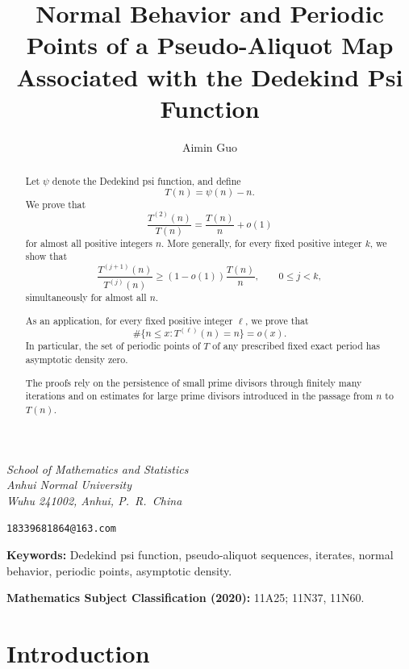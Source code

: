 \documentclass{article}
\begin{document}
\title{Normal Behavior and Periodic Points of a Pseudo-Aliquot Map Associated with the Dedekind Psi Function}

\author{Aimin Guo}

\date{}

\maketitle
\vspace{-2.0em}

\begin{center}
\small

\textit{School of Mathematics and Statistics}\\
\textit{Anhui Normal University}\\
\textit{Wuhu 241002, Anhui, P.~R.~China}

\vspace{0.4em}

\texttt{18339681864@163.com}

\end{center}

\begin{abstract}
Let $\psi$ denote the Dedekind psi function, and define
\[
T(n)=\psi(n)-n.
\]
We prove that
\[
\frac{T^{(2)}(n)}{T(n)}
=
\frac{T(n)}{n}+o(1)
\]
for almost all positive integers $n$. More generally, for every fixed
positive integer $k$, we show that
\[
\frac{T^{(j+1)}(n)}{T^{(j)}(n)}
\ge
(1-o(1))\frac{T(n)}{n},
\qquad 0\le j<k,
\]
simultaneously for almost all $n$.

As an application, for every fixed positive integer $\ell$, we prove
that
\[
\#\{n\le x:T^{(\ell)}(n)=n\}=o(x).
\]
In particular, the set of periodic points of $T$ of any prescribed
fixed exact period has asymptotic density zero.

The proofs rely on the persistence of small prime divisors through
finitely many iterations and on estimates for large prime divisors
introduced in the passage from $n$ to $T(n)$.
\end{abstract}

\noindent\textbf{Keywords:}
Dedekind psi function, pseudo-aliquot sequences, iterates,
normal behavior, periodic points, asymptotic density.

\noindent\textbf{Mathematics Subject Classification (2020):}
11A25; 11N37, 11N60.

\section{Introduction}
\end{document}
